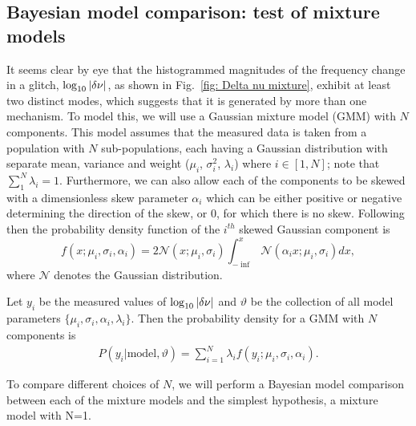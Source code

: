 \documentclass[../full_thesis/full_thesis.tex]{subfiles}
\begin{document}
\begin{subappendices}
\section{Bayesian model comparison: test of mixture models}
\label{sec: Bayesian model comparison}

It seems clear by eye that the histogrammed magnitudes of the frequency change
in a glitch, $\log_{10}|\delta\nu|$, as shown in Fig.~\ref{fig: Delta nu
mixture}, exhibit at least two distinct modes,
which suggests that it is generated by more than one
mechanism. To model this, we will use a Gaussian mixture model (GMM)
\citep{gelman2013bayesian} with $N$ components. This model assumes that the
measured data is taken from a population with $N$ sub-populations, each having
a Gaussian distribution with separate mean, variance and weight
($\mu_{i}$, $\sigma^{2}_{i}$, $\lambda_{i}$) where $i \in [1, N]$; note that $\sum_{1}^{N} \lambda_{i} = 1$.
Furthermore, we can also allow each of the components to be
skewed with a dimensionless skew parameter $\alpha_i$ which can be either
positive or negative determining the direction of the skew, or 0, for which
there is no skew. Following \citet{Ohagan1976} then
the probability density function of the $i^{th}$ skewed Gaussian component is
\begin{equation}
f(x; \mu_i, \sigma_i, \alpha_i)
= 2 \mathcal{N}(x; \mu_i, \sigma_i)
\int_{-\inf}^{x} \mathcal{N}(\alpha_i x; \mu_i, \sigma_i) dx,
\end{equation}
where $\mathcal{N}$ denotes the Gaussian distribution.

Let $y_{i}$ be the measured values of $\log_{10}|\delta\nu|$
and $\vartheta$ be the collection of all model parameters
$\{\mu_i, \sigma_i, \alpha_i, \lambda_i\}$.
Then the probability density for a GMM with $N$ components is
\begin{align}
P(y_i| \textrm{model}, \vartheta) =
 \sum_{i=1}^{N} \lambda_i f (y_i; \mu_i, \sigma_i, \alpha_i).
\end{align}

To compare different choices of $N$, we will perform a Bayesian model comparison
\citep{jaynes2003probability} between each of the mixture models and the
simplest hypothesis, a mixture model with N=1.


\end{subappendices}
\end{document}
